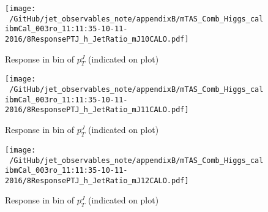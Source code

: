 \begin{figure}

\texttt{[image: ~/GitHub/jet\_observables\_note/appendixB/mTAS\_Comb\_Higgs\_calibmCal\_003ro\_11:11:35-10-11-2016/8ResponsePTJ\_h\_JetRatio\_mJ10CALO.pdf]}
\caption{Response in bin of  $p_{T}^{J}$ (indicated on plot)} 

\end{figure}

\begin{figure}

\texttt{[image: ~/GitHub/jet\_observables\_note/appendixB/mTAS\_Comb\_Higgs\_calibmCal\_003ro\_11:11:35-10-11-2016/8ResponsePTJ\_h\_JetRatio\_mJ11CALO.pdf]}
\caption{Response in bin of  $p_{T}^{J}$ (indicated on plot)} 

\end{figure}

\begin{figure}

\texttt{[image: ~/GitHub/jet\_observables\_note/appendixB/mTAS\_Comb\_Higgs\_calibmCal\_003ro\_11:11:35-10-11-2016/8ResponsePTJ\_h\_JetRatio\_mJ12CALO.pdf]}
\caption{Response in bin of  $p_{T}^{J}$ (indicated on plot)} 

\end{figure}
